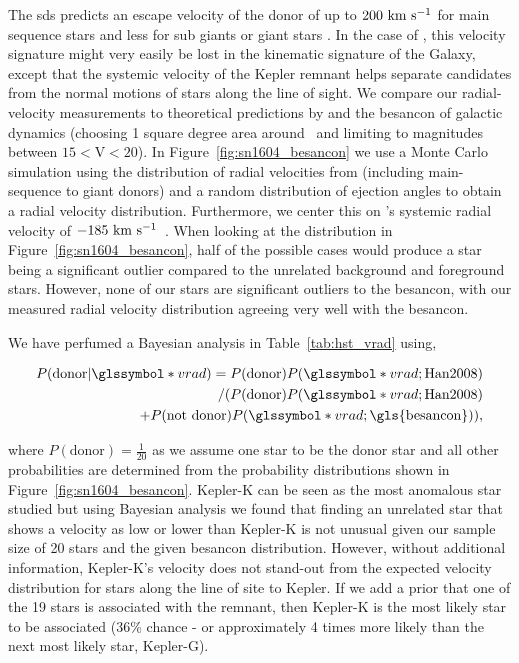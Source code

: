 \documentclass[preprint2]{aastex}
\begin{document}
The \gls{sds} predicts an escape velocity of the donor of up to $200~\textrm{km}~\textrm{s}^{-1}$ for main sequence stars and less for sub giants or giant stars \citep[down to roughly 60~\,\kms;][]{2008ApJ...677L.109H}. In the case of , this velocity signature might very easily be lost in the kinematic signature of the Galaxy, except that the systemic velocity of the Kepler remnant helps separate candidates from the normal motions of stars along the line of sight. We compare our radial-velocity measurements to theoretical predictions by \citet{2008ApJ...677L.109H} and the \gls{besancon} of galactic dynamics (choosing 1 square degree area around \ and limiting to magnitudes between $15<$V$<20$). In Figure~\ref{fig:sn1604_besancon} we use a Monte Carlo simulation using the distribution of radial velocities from \citet{2008ApJ...677L.109H} (including main-sequence to giant donors) and a random distribution of ejection angles to obtain a radial velocity distribution. Furthermore, we center this on 's systemic radial velocity of $-185~\textrm{km}~\textrm{s}^{-1}$\ \citep{2003A&A...407..249S}. When looking at the \citet{2008ApJ...677L.109H} distribution in Figure~\ref{fig:sn1604_besancon}, half of the possible cases would produce a star being a significant outlier compared to the unrelated background and foreground stars. However, none of our stars are significant outliers to the \gls{besancon}, with our measured radial velocity distribution agreeing very well with the \gls{besancon}. 


We have perfumed a Bayesian analysis in Table~\ref{tab:hst_vrad} using,

\begin{align}
P(\textrm{donor}|\vrad) = P(\textrm{donor})P(\vrad;\textrm{Han2008})\nonumber\\
 / (P(\textrm{donor})P(\vrad;\textrm{Han2008})\nonumber \\
+ P(\textrm{not donor})P(\vrad;\textrm{\gls{besancon}}))\nonumber,
\end{align}

where $P(\textrm{donor}) = \frac{1}{20}$ as we assume one star to be the donor star and all other probabilities are determined from the probability distributions shown in Figure~\ref{fig:sn1604_besancon}. Kepler-K can be seen as the most anomalous star studied but using Bayesian analysis we found that finding an unrelated star that shows a velocity as low or lower than  Kepler-K is not unusual given our sample size of 20 stars and the given \gls{besancon} distribution. However, without additional information, Kepler-K's velocity does not stand-out from the expected velocity distribution for stars along the line of site to Kepler. If we add a prior that one of the 19 stars is associated with the remnant, then Kepler-K is the most likely star to be associated (36\% chance - or approximately 4 times more likely than the next most likely star, Kepler-G).
\end{document}

